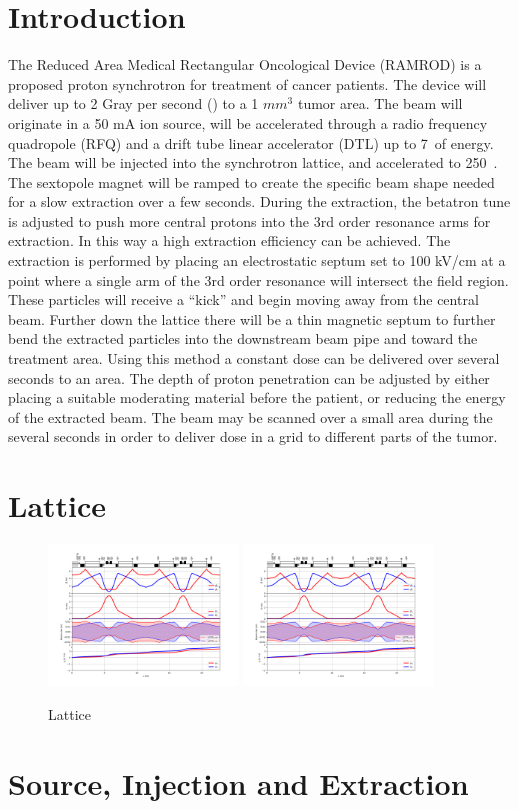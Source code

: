 
\section{Introduction}
The Reduced Area Medical Rectangular Oncological Device (RAMROD) is a proposed proton synchrotron for treatment of cancer patients.  The device will deliver up to 2
Gray per second (\gs) to a 1 $mm^3$ tumor area.  The beam will originate in a 50 mA ion source, will be accelerated through a radio frequency quadropole (RFQ) and 
a drift tube linear accelerator (DTL) up to 7~\mev of energy. The beam will be injected into the synchrotron lattice, and accelerated to 250~\mev.  The sextopole 
magnet will be ramped to create the specific beam shape needed for a slow extraction over a few seconds.  During the extraction, the betatron tune is adjusted
to push more central protons into the 3rd order resonance arms for extraction.  In this way a high extraction efficiency can be achieved.  The extraction is 
performed by placing an electrostatic septum set to 100 kV/cm at a point where a single arm of the 3rd order resonance will intersect the field region.  These
particles will receive a ``kick'' and begin moving away from the central beam.  Further down the lattice there will be a thin magnetic septum to further bend the extracted
particles into the downstream beam pipe and toward the treatment area.  Using this method a constant dose can be delivered over several seconds to an area.  The depth of 
proton penetration can be adjusted by either placing a suitable moderating material before the patient, or reducing the energy of the extracted beam.  The beam may be 
scanned over a small area during the several seconds in order to deliver dose in a grid to different parts of the tumor.  

\section{Lattice}

\begin{figure}[h]
  \begin{center}
    \includegraphics[width=0.45\textwidth]{twiss_33.png}
    \includegraphics[width=0.45\textwidth]{twiss_40.png}
    \caption{Lattice}
  \end{center}
  \label{fig:lat}
\end{figure}


\section{Source, Injection and Extraction}


